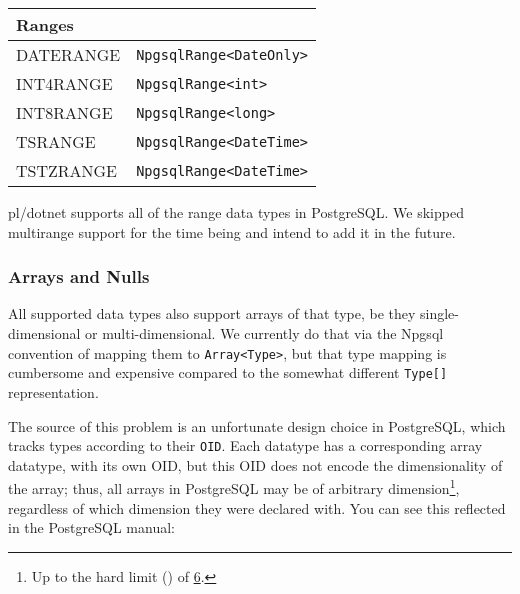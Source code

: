 \documentclass[sigconf,techreport,authorversion,nonacm]{acmart}
\begin{document}
\begin{table}[p]
\begin{tabular}{l | l}
                \multicolumn{2}{l}{Ranges}                                                       \\ \midrule
                DATERANGE                              & \texttt{NpgsqlRange<DateOnly>}          \\
                INT4RANGE                              & \texttt{NpgsqlRange<int>}               \\
                INT8RANGE                              & \texttt{NpgsqlRange<long>}              \\
                TSRANGE                                & \texttt{NpgsqlRange<DateTime>}          \\
                TSTZRANGE                              & \texttt{NpgsqlRange<DateTime>}          \\ \bottomrule
        \end{tabular}
\end{table}

pl/dotnet supports all of the range data types in PostgreSQL.
We skipped multirange support for the time being and intend
to add it in the future.

\subsubsection{Arrays and Nulls}

All supported data types also support arrays of that type, be they
single-dimensional or multi-dimensional. We currently do that via
the Npgsql convention of mapping them to \texttt{Array<Type>}, but
that type mapping is cumbersome and expensive compared to the
somewhat different \texttt{Type[]} representation.

The source of this problem is an unfortunate design choice in
PostgreSQL, which tracks types according to their \texttt{OID}.
Each datatype has a corresponding array datatype, with its own OID,
but this OID does not encode the dimensionality of the array; thus,
all arrays in PostgreSQL may be of arbitrary dimension\footnote{Up
to the hard limit () of \href{https://github.com/postgres/postgres/blob/master/src/include/utils/array.h\#L75}{6}.},
regardless of which dimension they were declared with. You can see
this reflected in the PostgreSQL manual:
\end{document}
